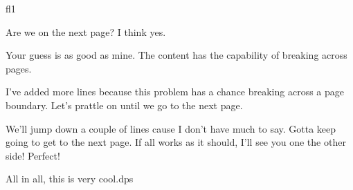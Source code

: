 \documentclass{article}
\begin{document}
\begin{exam}{fl1}
\begin{problem}
\begin{priorworkarea}
Are we on the next page? I think yes.
\end{priorworkarea}
\begin{solution}[nLines=10]
Your guess is as good as mine. The content has the capability of breaking across pages.

I've added more lines because this problem has a chance breaking across a page boundary.
Let's prattle on until we go to the next page.\vspace{\baselineskip}

We'll jump down a couple of lines cause I don't have much to say. Gotta keep
going to get to the next page. If all works as it should, I'll see you one
the other side! Perfect! \vspace{3\baselineskip}

\noindent
All in all, this is very cool.\enspace dps
\end{solution}
\end{problem}
\end{exam}
\end{document}
